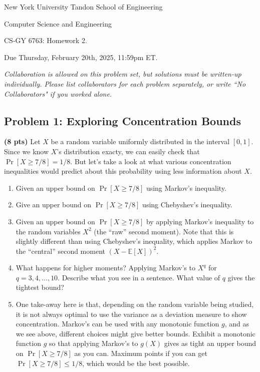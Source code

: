 \documentclass[10pt]{article}
\newcommand{\E}{\mathbb{E}}
\begin{document}
	
\begin{center}
	\normalsize
	New York University Tandon School of Engineering
	
	Computer Science and Engineering
	\medskip
	
	\large
	CS-GY 6763: Homework 2. 
	
	Due Thursday, February 20th, 2025, 11:59pm ET.
	\medskip
	
	\normalsize 
	\noindent \emph{Collaboration is allowed on this problem set, but solutions must be written-up individually. Please list collaborators for each problem separately, or write ``No Collaborators" if you worked alone.}

\end{center} 

\subsection{Problem 1: Exploring Concentration Bounds}
\textbf{(8 pts)} Let $X$ be a random variable uniformly distributed in the interval $[0,1]$. Since we know $X$'s distribution exacty, we can easily check that $\Pr[X \geq 7/8] = 1/8$. But let's take a look at what various concentration inequalities would predict about this probability using less information about $X$. 
\begin{enumerate}
	\item Given an upper bound on $\Pr[X \geq 7/8]$ using Markov's inequality. 
	\item Give an upper bound on $\Pr[X \geq 7/8]$ using Chebyshev's inequality.
	\item Given an upper bound on $\Pr[X \geq 7/8]$ by applying Markov's inequality to the random variables $X^2$ (the ``raw'' second moment). 
	Note that this is slightly different than using Chebyshev's inequality, which applies Markov to the ``central'' second moment $(X - \E[X])^2$.
	\item What happens for higher moments? Applying Markov's to $X^q$ for $q = 3,4, \ldots, 10$. Describe what you see in a sentence. What value of $q$ gives the tightest bound?
		\item One take-away here is that, depending on the random variable being studied, it is not always optimal to use the variance as a deviation measure to show concentration. Markov's can be used with any monotonic function $g$, and as we see above, different choices might give better bounds. Exhibit a monotonic function $g$ so that applying Markov’s to $g(X)$ gives as tight an upper bound on $\Pr[X \geq 7/8]$ as you can. Maximum points if you can get $\Pr[X \geq 7/8] \leq 1/8$, which would be the best possible.
\end{enumerate}
\end{document}
